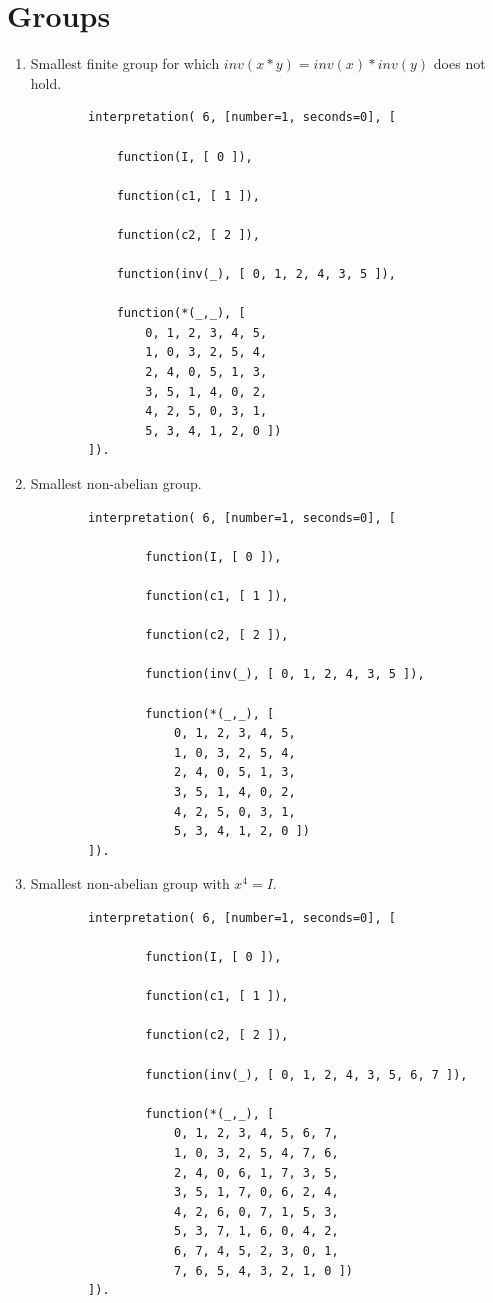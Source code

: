 \documentclass{scrartcl}
\begin{document}
\section{Groups}
\label{apx: groups}
\begin{enumerate}[label=\alph*)]
	\item
		Smallest finite group for which $inv(x*y)=inv(x)*inv(y)$ does not hold.
		\begin{verbatim}
		interpretation( 6, [number=1, seconds=0], [

		    function(I, [ 0 ]),

		    function(c1, [ 1 ]),

		    function(c2, [ 2 ]),

		    function(inv(_), [ 0, 1, 2, 4, 3, 5 ]),

		    function(*(_,_), [
		        0, 1, 2, 3, 4, 5,
		        1, 0, 3, 2, 5, 4,
		        2, 4, 0, 5, 1, 3,
		        3, 5, 1, 4, 0, 2,
		        4, 2, 5, 0, 3, 1,
		        5, 3, 4, 1, 2, 0 ])
		]).
		\end{verbatim}

	\item
		Smallest non-abelian group.
		\begin{verbatim}
		interpretation( 6, [number=1, seconds=0], [

			    function(I, [ 0 ]),

			    function(c1, [ 1 ]),

			    function(c2, [ 2 ]),

			    function(inv(_), [ 0, 1, 2, 4, 3, 5 ]),

			    function(*(_,_), [
			        0, 1, 2, 3, 4, 5,
			        1, 0, 3, 2, 5, 4,
			        2, 4, 0, 5, 1, 3,
			        3, 5, 1, 4, 0, 2,
			        4, 2, 5, 0, 3, 1,
			        5, 3, 4, 1, 2, 0 ])
		]).
		\end{verbatim}

	\item
		\pagebreak
		Smallest non-abelian group with $x^4 = I$.
		\begin{verbatim}
		interpretation( 6, [number=1, seconds=0], [

			    function(I, [ 0 ]),

			    function(c1, [ 1 ]),

			    function(c2, [ 2 ]),

			    function(inv(_), [ 0, 1, 2, 4, 3, 5, 6, 7 ]),

			    function(*(_,_), [
			        0, 1, 2, 3, 4, 5, 6, 7,
			        1, 0, 3, 2, 5, 4, 7, 6,
			        2, 4, 0, 6, 1, 7, 3, 5,
			        3, 5, 1, 7, 0, 6, 2, 4,
			        4, 2, 6, 0, 7, 1, 5, 3,
			        5, 3, 7, 1, 6, 0, 4, 2,
			        6, 7, 4, 5, 2, 3, 0, 1,
			        7, 6, 5, 4, 3, 2, 1, 0 ])
		]).
		\end{verbatim}
\end{enumerate}
\end{document}
